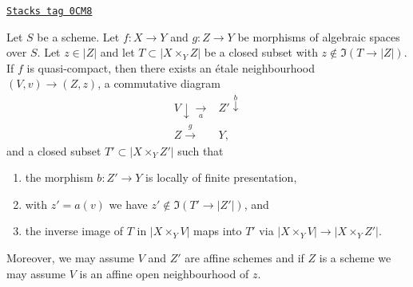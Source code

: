 \begin{lemma}[Separate]
\label{spaces-limits-lemma-separate}
\href{https://stacks.math.columbia.edu/tag/0CM8}{\texttt{Stacks tag 0CM8}}

Let $S$ be a scheme. Let $f : X \to Y$ and $g : Z \to Y$ be
morphisms of algebraic spaces over $S$. Let $z \in |Z|$ and let
$T \subset |X \times_Y Z|$ be a closed subset
with $z \not \in \Im(T \to |Z|)$.
If $f$ is quasi-compact, then there exists
an \'etale neighbourhood $(V, v) \to (Z, z)$,
a commutative diagram
$$
\begin{array}{cc}V \downarrow\underset{a}{\longrightarrow} & Z' \overset{b}{\downarrow} \\ Z \overset{g}{\longrightarrow} & Y,\end{array}
$$
and a closed subset $T' \subset |X \times_Y Z'|$ such that
\begin{enumerate}
\item the morphism $b : Z' \to Y$ is locally of finite presentation,
\item with $z' = a(v)$ we have $z' \not \in \Im(T' \to |Z'|)$, and
\item the inverse image of $T$ in $|X \times_Y V|$
maps into $T'$ via $|X \times_Y V| \to |X \times_Y Z'|$.
\end{enumerate}
Moreover, we may assume $V$ and $Z'$ are affine schemes and if $Z$
is a scheme we may assume $V$ is an affine open neighbourhood of $z$.
\end{lemma}

